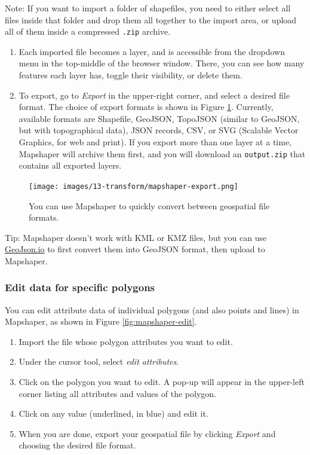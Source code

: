 \documentclass[
  english,
]{book}
\begin{document}
Note: If you want to import a folder of shapefiles, you need to either select all files inside that folder
and drop them all together to the import area, or upload all of them inside a compressed \texttt{.zip} archive.

\begin{enumerate}
\def\labelenumi{\arabic{enumi}.}
\setcounter{enumi}{2}
\item
  Each imported file becomes a layer, and is accessible from the dropdown menu in the top-middle
  of the browser window. There, you can see how many features each layer has, toggle their visibility,
  or delete them.
\item
  To export, go to \emph{Export} in the upper-right corner, and select a desired file format.
  The choice of export formats is shown in Figure \ref{fig:mapshaper-export}.
  Currently, available formats are Shapefile, GeoJSON,
  TopoJSON (similar to GeoJSON, but with topographical data), JSON records, CSV,
  or SVG (Scalable Vector Graphics, for web and print). If you export more than one layer at a time,
  Mapshaper will archive them first, and you will download an \texttt{output.zip} that contains
  all exported layers.
\end{enumerate}



\begin{figure}
\centering
\texttt{[image: images/13-transform/mapshaper-export.png]}
\caption{\label{fig:mapshaper-export}You can use Mapshaper to quickly convert between geospatial file formats.}
\end{figure}

Tip: Mapshaper doesn't work with KML or KMZ files, but you can use \href{geojson.html}{GeoJson.io} to first convert them into GeoJSON format, then upload to Mapshaper.

\hypertarget{edit-data-for-specific-polygons}{%
\subsubsection*{Edit data for specific polygons}\label{edit-data-for-specific-polygons}}

You can edit attribute data of individual polygons (and also points and lines) in Mapshaper, as shown in Figure \ref{fig:mapshaper-edit}.

\begin{enumerate}
\def\labelenumi{\arabic{enumi}.}
\item
  Import the file whose polygon attributes you want to edit.
\item
  Under the cursor tool, select \emph{edit attributes}.
\item
  Click on the polygon you want to edit. A pop-up will appear in the upper-left corner
  listing all attributes and values of the polygon.
\item
  Click on any value (underlined, in blue) and edit it.
\item
  When you are done, export your geospatial file by clicking \emph{Export} and
  choosing the desired file format.
\end{enumerate}
\end{document}
